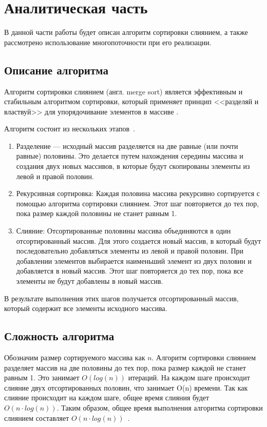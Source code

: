 \chapter{Аналитическая часть}
В данной части работы будет описан  алгоритм сортировки слиянием, 
а также рассмотрено использование многопоточности при его реализации.




\section{Описание алгоритма}
Алгоритм сортировки слиянием (англ. merge sort) является эффективным и стабильным алгоритмом сортировки, который применяет принцип <<разделяй и властвуй>> для упорядочивание элементов в массиве \cite{merge-sort}.

Алгоритм состоит из нескольких этапов~\cite{merge-sort}.
\begin{enumerate}
	\item Разделение ---  исходный массив разделяется на две равные (или почти равные) половины. Это делается путем нахождения середины массива и создания двух новых массивов, в которые будут скопированы элементы из левой и правой половин.
	
	\item Рекурсивная сортировка: Каждая половина массива рекурсивно сортируется с помощью алгоритма сортировки слиянием. Этот шаг повторяется до тех пор, пока размер каждой половины не станет равным 1.

	\item Слияние: Отсортированные половины массива объединяются в один отсортированный массив. Для этого создается новый массив, в который будут последовательно добавляться элементы из левой и правой половин. При добавлении элементов выбирается наименьший элемент из двух половин и добавляется в новый массив. Этот шаг повторяется до тех пор, пока все элементы не будут добавлены в новый массив.
\end{enumerate}
В результате выполнения этих шагов получается отсортированный массив, который содержит все элементы исходного массива.

\section{Сложность алгоритма}
Обозначим размер сортируемого массива как $n$. 
Алгоритм сортировки слиянием разделяет массив на две половины до тех пор, пока размер каждой  не станет равным 1. Это занимает $O(log(n))$ итераций.
На каждом шаге происходит слияние двух отсортированных половин, что занимает O(n) времени. Так как слияние происходит на каждом шаге, общее время слияния будет $O(n \cdot log(n))$.
Таким образом, общее время выполнения алгоритма сортировки слиянием составляет $O(n  \cdot log(n))$~\cite{merge-sort}.


